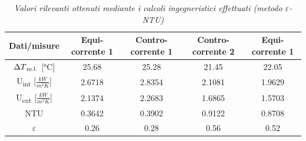 \documentclass[a4paper,10pt]{article}                                                                                       %
\begin{document}
\begin{table}[H]                                                                                                            %
  \centering                                                                                                                %
  \begin{tabular}{||c|c|c|c|c||}                                                                                            %
    \hline
    Dati/misure                                 & Equi-corrente 1 & Contro-corrente 1 & Contro-corrente 2 & Equi-corrente 1 \\
    \hline\hline
    $\Delta{T\textsubscript{m.l.}}$ [°C]        & 25.68           & 25.28             & 21.45             & 22.05           \\
    U\textsubscript{int} [$\frac{kW}{m^{2}K}$]  & 2.6718          & 2.8354            & 2.1081            & 1.9629          \\
    U\textsubscript{ext} [$\frac{kW}{m^{2}K}$]  & 2.1374          & 2.2683            & 1.6865            & 1.5703          \\
    NTU                                         & 0.3642          & 0.3902            & 0.9122            & 0.8708          \\
    $\varepsilon$                               & 0.26            & 0.28              & 0.56              & 0.52            \\
    \hline
  \end{tabular}                                                                                                             %
  \caption{\textit{Valori rilevanti ottenuti mediante i calcoli ingegneristici effettuati (metodo $\varepsilon$-NTU)}}      %
  \label{tab:eps_ntu_calcs}                                                                                                 %
\end{table}                                                                                                                 %
\vspace{3mm}                                                                                                                %
\end{document}
